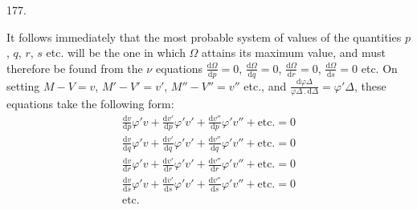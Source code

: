 \begin{center}\hypertarget{native-249-article177}{}177.\end{center}
It follows immediately that the most probable system of values of the quantities $p$, $q$, $r$, $s$ etc. will be the one in which $\Omega$ attains its maximum value, and must therefore be found from the $\nu$ equations $\frac{\mathrm{d}\Omega}{\mathrm{d}p}=0$, $\frac{\mathrm{d}\Omega}{\mathrm{d}q}=0$, $\frac{\mathrm{d}\Omega}{\mathrm{d}r}=0$, $\frac{\mathrm{d}\Omega}{\mathrm{d}s}=0$ etc. On setting $M-V=v$, $M'-V'=v'$, $M''-V''=v''$ etc., and $\frac{\mathrm{d}\varphi\Delta}{\varphi\Delta\,.\,\mathrm{d}\Delta}=\varphi'\Delta$, these equations take the following form:
\[
\begin{gathered}
\frac{\mathrm{d}v}{\mathrm{d}p}\varphi'v+
\frac{\mathrm{d}v'}{\mathrm{d}p}\varphi'v'+
\frac{\mathrm{d}v''}{\mathrm{d}p}\varphi'v''+\text{etc.}=0\\
\frac{\mathrm{d}v}{\mathrm{d}q}\varphi'v+
\frac{\mathrm{d}v'}{\mathrm{d}q}\varphi'v'+
\frac{\mathrm{d}v''}{\mathrm{d}q}\varphi'v''+\text{etc.}=0\\
\frac{\mathrm{d}v}{\mathrm{d}r}\varphi'v+
\frac{\mathrm{d}v'}{\mathrm{d}r}\varphi'v'+
\frac{\mathrm{d}v''}{\mathrm{d}r}\varphi'v''+\text{etc.}=0\\
\frac{\mathrm{d}v}{\mathrm{d}s}\varphi'v+
\frac{\mathrm{d}v'}{\mathrm{d}s}\varphi'v'+
\frac{\mathrm{d}v''}{\mathrm{d}s}\varphi'v''+\text{etc.}=0\\
\text{etc.}
\end{gathered}
\]

